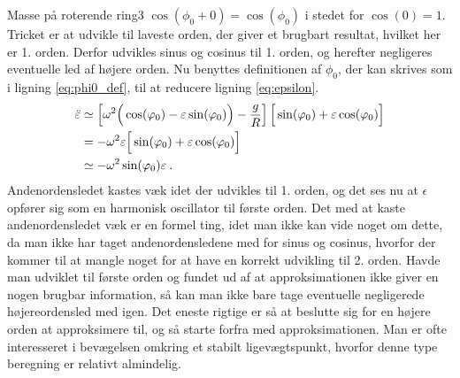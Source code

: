 \begin{opgave}{Masse på roterende ring}{3}
$\cos(\phi_0 + 0) = \cos(\phi_0)$ i stedet for $\cos(0) = 1$. \\[2mm]
Tricket er at udvikle til laveste orden, der giver et brugbart resultat, hvilket her er 1. orden. Derfor udvikles sinus og cosinus til 1. orden, og herefter negligeres eventuelle led af højere orden. Nu benyttes definitionen af $\phi_0$, der kan skrives som i ligning \eqref{eq:phi0_def}, til at reducere ligning \eqref{eq:epsilon}.
\begin{align*}
	\ddot{\varepsilon} &\simeq \left[\omega^2\Big(\cos(\varphi_0) - \varepsilon\sin(\varphi_0)\Big) - \frac{g}{R}\right]\Big[\sin(\varphi_0) + \varepsilon\cos(\varphi_0)\Big] \\
	&= -\omega^2\varepsilon\Big[\sin(\varphi_0) + \varepsilon\cos(\varphi_0)\Big] \\
	&\simeq -\omega^2\sin(\varphi_0)\varepsilon \: .
\end{align*}
Andenordensledet kastes væk idet der udvikles til 1. orden, og det ses nu at $\epsilon$ opfører sig som en harmonisk oscillator til første orden. Det med at kaste andenordensledet væk er en formel ting, idet man ikke kan vide noget om dette, da man ikke har taget andenordensledene med for sinus og cosinus, hvorfor der kommer til at mangle noget for at have en korrekt udvikling til 2. orden. Havde man udviklet til første orden og fundet ud af at approksimationen ikke giver en nogen brugbar information, så kan man ikke bare tage eventuelle negligerede højereordensled med igen. Det eneste rigtige er så at beslutte sig for en højere orden at approksimere til, og så starte forfra med approksimationen. Man er ofte interesseret i bevægelsen omkring et stabilt ligevægtspunkt, hvorfor denne type beregning er relativt almindelig.
\end{opgave}
%
%
